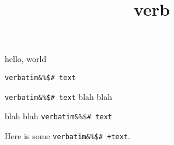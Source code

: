 \documentclass{amsart}
\title{verb}
\begin{document}
\maketitle

hello, world


\verb+verbatim&%$# text+

\verb+verbatim&%$# text+ blah blah 

blah blah \verb+verbatim&%$# text+

Here is some \verb~verbatim&%$# +text~.
\end{document}
